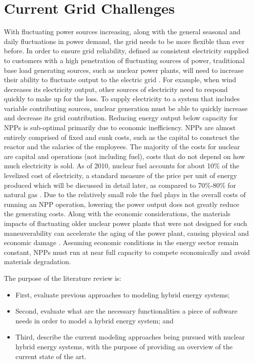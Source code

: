 \documentclass[12pt]{UIdahoMastersThesis}
\begin{document}
\section{Current Grid Challenges}
With fluctuating power sources increasing, along with the general seasonal and daily fluctuations in power demand, the grid needs to be more flexible than ever before. In order to ensure grid reliability, defined as consistent electricity supplied to customers with a high penetration of fluctuating sources of power, traditional base load generating sources, such as nuclear power plants, will need to increase their ability to fluctuate output to the electric grid \cite {Denholm2011}. For example, when wind decreases its electricity output, other sources of electricity need to respond quickly to make up for the loss. To supply electricity to a system that includes variable contributing sources, nuclear generation must be able to quickly increase and decrease its grid contribution.
Reducing energy output below capacity for NPPs is sub-optimal primarily due to economic inefficiency\cite{Nuclear2011}. NPPs are almost entirely comprised of fixed and sunk costs, such as the capital to construct the reactor and the salaries of the employees. The majority of the costs for nuclear are capital and operations (not including fuel), costs that do not depend on how much electricity is sold. As of 2010, nuclear fuel accounts for about 10\% of the levelized cost of electricity, a standard measure of the price per unit of energy produced which will be discussed in detail later, as compared to 70\%-80\% for natural gas \cite{IEA/NEA}. Due to the relatively small role the fuel plays in the overall costs of running an NPP operation, lowering the power output does not greatly reduce the generating costs. Along with the economic considerations, the materials impacts  of fluctuating older nuclear power plants that were not designed for such maneuverability can accelerate the aging of the power plant, causing physical and economic damage \cite{Nuclear2011}. Assuming economic conditions in the energy sector remain constant, NPPs must run at near full capacity to compete economically and avoid materials degradation.

The purpose of the literature review is:
\begin{itemize}
\item First, evaluate previous approaches to modeling hybrid energy systems;
\item Second, evaluate what are the necessary functionalities a piece of software needs in order to model a hybrid energy system; and
\item Third, describe the current modeling approaches being pursued with nuclear hybrid energy systems, with the purpose of providing an overview of the current state of the art.
\end{itemize}
\end{document}

